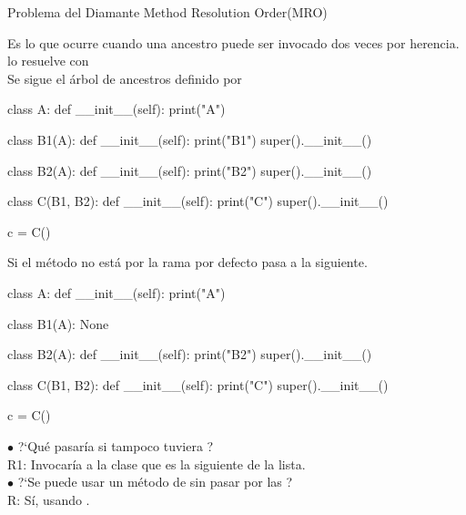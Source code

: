 \documentclass[10pt,envcountsect,spanish]{beamer}
\begin{document}
\begin{frame}[fragile, label=ProblemaDiamante]{Problema del Diamante}
{ Method Resolution Order(MRO)}
\scriptsize
\begin{minipage}{.48\textwidth}
Es lo que ocurre cuando una ancestro puede ser invocado dos veces por herencia.
\hfill {} lo resuelve con  \\
Se sigue el árbol de ancestros  definido por 
\begin{pyconsole}[][frame=single]
class A:
    def __init__(self):
        print("A")

class B1(A):
    def __init__(self):
        print("B1")
        super().__init__()

class B2(A):
    def __init__(self):
        print("B2")
        super().__init__()

class C(B1, B2):
    def __init__(self):
        print("C")
        super().__init__()

c = C()
 
\end{pyconsole}
\end{minipage}
\hfill
\begin{minipage}{.48\textwidth}
Si el método no está por la rama por defecto pasa a la siguiente.
\begin{pyconsole}[][frame=single]
class A:
    def __init__(self):
        print("A")

class B1(A):
    None

class B2(A):
    def __init__(self):
        print("B2")
        super().__init__()

class C(B1, B2):
    def __init__(self):
        print("C")
        super().__init__()

c = C()
\end{pyconsole}

$\bullet$ ?`Qué pasaría si  tampoco tuviera ?\\
R1: Invocaría a la clase  que es la siguiente de la lista. \\
$\bullet$ ?`Se puede usar un método de  sin pasar por las ?\\
R: Sí, usando  .
\end{minipage}

\end{frame}
\end{document}
